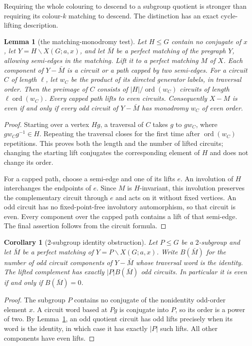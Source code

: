 \documentclass[11pt,a4paper]{article}
\newtheorem{lemma}[theorem]{Lemma}
\newtheorem{corollary}[theorem]{Corollary}
\theoremstyle{definition}
\theoremstyle{remark}
\newcommand{\ord}{\operatorname{ord}}
\newcommand{\X}[3]{X(#1;#2,#3)}
\begin{document}
Requiring the whole colouring to descend to a subgroup quotient is stronger than requiring its colour-$k$ matching to descend.  The distinction has an exact cycle-lifting description.
\begin{lemma}[the matching-monodromy test]\label{lem:matching-monodromy}
Let $H\le G$ contain no conjugate of $x$, let $Y=H\backslash\X{G}{a}{x}$, and let $\bar M$ be a perfect matching of the pregraph $Y$, allowing semi-edges in the matching.  Lift it to a perfect matching $M$ of $X$.  Each component of $Y-\bar M$ is a circuit or a path capped by two semi-edges.  For a circuit $C$ of length $\ell$, let $w_C$ be the product of its directed generator labels, in traversal order.  Then the preimage of $C$ consists of $|H|/\ord(w_C)$ circuits of length $\ell\ord(w_C)$.  Every capped path lifts to even circuits.  Consequently $X-M$ is even if and only if every odd circuit of $Y-\bar M$ has monodromy $w_C$ of even order.
\end{lemma}
\begin{proof}
Starting over a vertex $Hg$, a traversal of $C$ takes $g$ to $gw_C$, where $gw_Cg^{-1}\in H$.  Repeating the traversal closes for the first time after $\ord(w_C)$ repetitions.  This proves both the length and the number of lifted circuits; changing the starting lift conjugates the corresponding element of $H$ and does not change its order.

For a capped path, choose a semi-edge and one of its lifts $e$.  An involution of $H$ interchanges the endpoints of $e$.  Since $M$ is $H$-invariant, this involution preserves the complementary circuit through $e$ and acts on it without fixed vertices.  An odd circuit has no fixed-point-free involutory automorphism, so that circuit is even.  Every component over the capped path contains a lift of that semi-edge.  The final assertion follows from the circuit formula.
\end{proof}

\begin{corollary}[$2$-subgroup identity obstruction]\label{cor:sylow-identity}
Let $P\le G$ be a $2$-subgroup and let $\bar M$ be a perfect matching of $Y=P\backslash\X{G}{a}{x}$.  Write $B(\bar M)$ for the number of odd circuit components of $Y-\bar M$ whose traversal word is the identity.  The lifted complement has exactly $|P|B(\bar M)$ odd circuits.  In particular it is even if and only if $B(\bar M)=0$.
\end{corollary}
\begin{proof}
The subgroup $P$ contains no conjugate of the nonidentity odd-order element $x$.  A circuit word based at $Pg$ is conjugate into $P$, so its order is a power of two.  By Lemma~\ref{lem:matching-monodromy}, an odd quotient circuit has odd lifts precisely when its word is the identity, in which case it has exactly $|P|$ such lifts.  All other components have even lifts.
\end{proof}
\end{document}
